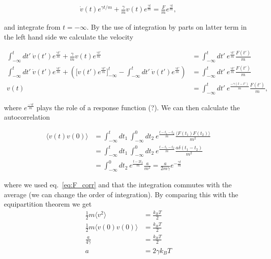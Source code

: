 \begin{align*}
  \dot{ v}(t)e^{\gamma t /m} + \frac{\gamma}{m} v(t)e^{\frac{\gamma t}{m}}  = \frac{ F}{m}e^{\frac{\gamma t}{m}},
\end{align*}

and integrate from $t = -\infty$. By the use of integration by parts on latter term in the left hand side we calculate the velocity 

\begin{align*}
  \int_{-\infty}^t dt' \ \dot{ v}(t')e^{\frac{\gamma t'}{m}} + \frac{\gamma}{m} v(t)e^{\frac{\gamma t'}{m}} &=  \int_{-\infty}^t dt' \ e^{\frac{\gamma t'}{m}} \frac{ F(t')}{m}  \\
  \int_{-\infty}^t dt' \ \dot{ v}(t')e^{\frac{\gamma t'}{m}} + \left(\Big[ v(t')e^{\frac{\gamma t'}{m}}\Big]_{-\infty}^t - \int_{-\infty}^t dt' \ \dot{ v}(t')e^{\frac{\gamma t'}{m}}\right) &= \int_{-\infty}^t dt' \ e^{\frac{\gamma t'}{m}} \frac{ F(t')}{m}  \\
   v(t) &= \int_{-\infty}^t dt' \ e^{\frac{-\gamma(t - t')}{m}} \frac{ F(t')}{m},
\end{align*}

where $e^{\frac{-\gamma t}{m}}$ plays the role of a response function (?). We can then calculate the autocorrelation 


\begin{align*}
  \big\langle  v(t) v(0) \big\rangle &= \int_{-\infty}^t dt_1 \ \int_{-\infty}^0 dt_2 \ e^{\frac{t - t_1 - t_2}{m}} \frac{\langle  F(t_1)  F(t_2) \rangle}{m^2} \\
  &= \int_{-\infty}^t dt_1 \ \int_{-\infty}^0 dt_2 \ e^{\frac{t - t_1 - t_2}{m}} \frac{a \delta(t_1 - t_2)}{m^2} \\
  &= \int_{-\infty}^0 dt_2 \ e^{\frac{t - 2t_2}{m}} \frac{a}{m^2} = \frac{a}{2m\gamma}e^{-\frac{\gamma t}{m}}
\end{align*}

where we used eq.~\eqref{eq:F_corr} and that the integration commutes with the average (we can change the order of integration). By comparing this with the equipartition theorem we get 
\begin{align*}
  \frac{1}{2}m\langle  v^2 \rangle &= \frac{k_BT}{2} \\
  \frac{1}{2}m\langle  v(0) v(0) \rangle &= \frac{k_BT}{2} \\
  \frac{a}{4\gamma} &= \frac{k_BT}{2} \\
  a &=  2\gamma k_B T \\
\end{align*}

